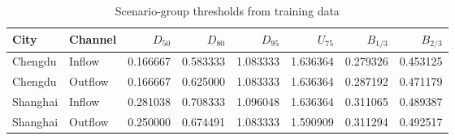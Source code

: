 \begin{table}[!htbp]
  \centering\footnotesize
  \caption{Scenario-group thresholds from training data}
  \label{tab:scenario-group-thresholds}
  \setlength{\tabcolsep}{4pt}
  \begin{tabular}{llrrrrrr}
    \toprule
    City & Channel & \(D_{50}\) & \(D_{80}\) & \(D_{95}\) & \(U_{75}\) & \(B_{1/3}\) & \(B_{2/3}\) \\
    \midrule
    Chengdu & Inflow & 0.166667 & 0.583333 & 1.083333 & 1.636364 & 0.279326 & 0.453125 \\
    Chengdu & Outflow & 0.166667 & 0.625000 & 1.083333 & 1.636364 & 0.287192 & 0.471179 \\
    Shanghai & Inflow & 0.281038 & 0.708333 & 1.096048 & 1.636364 & 0.311065 & 0.489387 \\
    Shanghai & Outflow & 0.250000 & 0.674491 & 1.083333 & 1.590909 & 0.311294 & 0.492517 \\
    \bottomrule
  \end{tabular}
\end{table}
